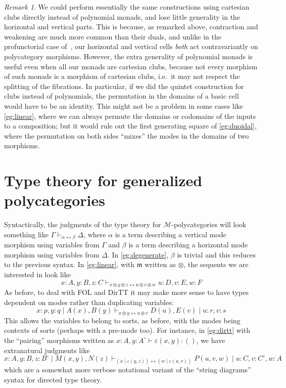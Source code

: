 \documentclass{article}
\theoremstyle{definition}
\theoremstyle{remark}
\newtheorem{rmk}[thm]{Remark}
\def\M{\mathcal{M}}
\def\mult{\mathfrak{m}}
\let\tot\leftrightarrow
\def\o{^{\circ}}
\begin{document}
\begin{rmk}
  We could perform essentially the same constructions using cartesian clubs directly instead of polynomial monads, and lose little generality in the horizontal and vertical parts.
  This is because, as remarked above, contraction and weakening are much more common than their duals, and unlike in the profunctorial case of~\cite{garner:polycats}, our horizontal and vertical cells \emph{both} act contravariantly on polycategory morphisms.
  However, the extra generality of polynomial monads is useful even when all our monads are cartesian clubs, because not every morphism of such monads is a morphism of cartesian clubs, i.e.\ it may not respect the splitting of the fibrations.
  In particular, if we did the quintet construction for clubs instead of polynomials, the permutation in the domains of a basic cell would have to be an identity.
  This might not be a problem in some cases like \cref{eg:linear}, where we can always permute the domains or codomains of the inputs to a composition; but it would rule out the first generating square of \cref{eg:duoidal}, where the permutation on both sides ``mixes'' the modes in the domains of two morphisms.
\end{rmk}


\section{Type theory for generalized polycategories}
\label{sec:syntax}

Syntactically, the judgments of the type theory for $\M$-polycategories will look something like $\Gamma \vdash_{\alpha\tot\beta} \Delta$, where $\alpha$ is a term describing a vertical mode morphism using variables from $\Gamma$ and $\beta$ is a term describing a horizontal mode morphism using variables from $\Delta$.
In \cref{eg:degenerate}, $\beta$ is trivial and this reduces to the previous syntax.
In \cref{eg:linear}, with $\mult$ written as $\otimes$, the sequents we are interested in look like
\[ x:A, y:B, z:C \vdash_{x\otimes y\otimes z \tot u\otimes v\otimes w} u:D, v:E, w:F \]
As before, to deal with FOL and DirTT it may make more sense to have types dependent on modes rather than duplicating variables:
\[ x:p, y:q \mid A(x), B(y) \vdash_{x\otimes y \tot u\otimes v} D(u), E(v) \mid u:r, v:s \]
This allows the variables to belong to sorts, as before, with the modes being contexts of sorts (perhaps with a pre-mode too).
For instance, in \cref{eg:dirtt} with the ``pairing'' morphisms written as $x:A, y:A\o \vdash \varepsilon(x,y) : ()$, we have extranatural judgments like
\[ x:A, y:B, z:B\o \mid M(x,y),N(z) \vdash_{(x\mid \varepsilon(y,z)) \tot (w\mid\varepsilon(u,v))} P(u,v,w) \mid u:C, v:C\o, w:A \]
which are a somewhat more verbose notational variant of the ``string diagrams'' syntax for directed type theory.
\end{document}

